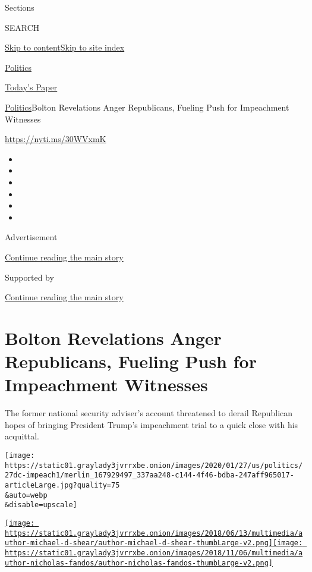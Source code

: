 Sections

SEARCH

\protect\hyperlink{site-content}{Skip to
content}\protect\hyperlink{site-index}{Skip to site index}

\href{https://www.nytimes3xbfgragh.onion/section/politics}{Politics}

\href{https://myaccount.nytimes3xbfgragh.onion/auth/login?response_type=cookie\&client_id=vi}{}

\href{https://www.nytimes3xbfgragh.onion/section/todayspaper}{Today's
Paper}

\href{/section/politics}{Politics}\textbar{}Bolton Revelations Anger
Republicans, Fueling Push for Impeachment Witnesses

\url{https://nyti.ms/30WVxmK}

\begin{itemize}
\item
\item
\item
\item
\item
\item
\end{itemize}

Advertisement

\protect\hyperlink{after-top}{Continue reading the main story}

Supported by

\protect\hyperlink{after-sponsor}{Continue reading the main story}

\hypertarget{bolton-revelations-anger-republicans-fueling-push-for-impeachment-witnesses}{%
\section{Bolton Revelations Anger Republicans, Fueling Push for
Impeachment
Witnesses}\label{bolton-revelations-anger-republicans-fueling-push-for-impeachment-witnesses}}

The former national security adviser's account threatened to derail
Republican hopes of bringing President Trump's impeachment trial to a
quick close with his acquittal.

\texttt{[image: https://static01.graylady3jvrrxbe.onion/images/2020/01/27/us/politics/27dc-impeach1/merlin\_167929497\_337aa248-c144-4f46-bdba-247aff965017-articleLarge.jpg?quality=75\\\&auto=webp\\\&disable=upscale]}

\href{https://www.nytimes3xbfgragh.onion/by/michael-d-shear}{\texttt{[image: https://static01.graylady3jvrrxbe.onion/images/2018/06/13/multimedia/author-michael-d-shear/author-michael-d-shear-thumbLarge-v2.png]}}\href{https://www.nytimes3xbfgragh.onion/by/nicholas-fandos}{\texttt{[image: https://static01.graylady3jvrrxbe.onion/images/2018/11/06/multimedia/author-nicholas-fandos/author-nicholas-fandos-thumbLarge-v2.png]}}

